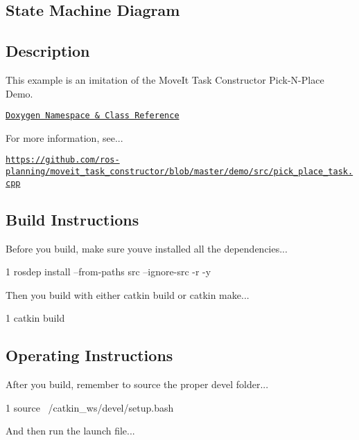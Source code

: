 \subsection*{State Machine Diagram}



\subsection*{Description}

This example is an imitation of the Move\+It Task Constructor Pick-\/\+N-\/\+Place Demo.~\newline


\href{https://reelrbtx.github.io/SMACC_Documentation/master/html/namespacesm__mtc__picknplace.html}{\tt Doxygen Namespace \& Class Reference}

For more information, see...

\href{https://github.com/ros-planning/moveit_task_constructor/blob/master/demo/src/pick_place_task.cpp}{\tt https\+://github.\+com/ros-\/planning/moveit\+\_\+task\+\_\+constructor/blob/master/demo/src/pick\+\_\+place\+\_\+task.\+cpp}

\subsection*{Build Instructions}

Before you build, make sure you\textquotesingle{}ve installed all the dependencies...


\begin{DoxyCode}
1 rosdep install --from-paths src --ignore-src -r -y 
\end{DoxyCode}


Then you build with either catkin build or catkin make...


\begin{DoxyCode}
1 catkin build
\end{DoxyCode}


\subsection*{Operating Instructions}

After you build, remember to source the proper devel folder...


\begin{DoxyCode}
1 source ~/catkin\_ws/devel/setup.bash
\end{DoxyCode}


And then run the launch file...


